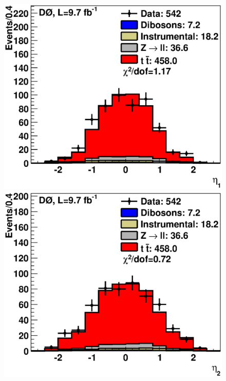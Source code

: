 \documentclass[aps,prd,twocolumn,showpacs,superscriptaddress,groupedaddress,floatfix]{revtex4}
\begin{document}
\begin{figure}[!ht]
\includegraphics[width=\the\unitlength]{h_6.eps}
\includegraphics[width=\the\unitlength]{h_7.eps}


\end{figure}
\end{document}
